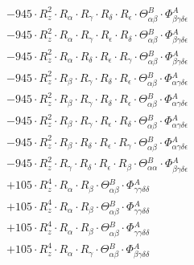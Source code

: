 \documentclass{article}
\begin{document}
\begin{subequations}
\begin{gather}
\begin{array}{c}
 \\[0.2em] 		 - 945 \cdot R_{z}^{2} \cdot R_{\alpha{}} \cdot R_{\gamma{}} \cdot R_{\delta{}} \cdot R_{\epsilon{}} \cdot \Theta{}^{B}_{\alpha{}\beta{}} \cdot \Phi{}^{A}_{\beta{}\gamma{}\delta{}\epsilon{}} 
 \\[0.2em] 		 - 945 \cdot R_{z}^{2} \cdot R_{\alpha{}} \cdot R_{\gamma{}} \cdot R_{\epsilon{}} \cdot R_{\delta{}} \cdot \Theta{}^{B}_{\alpha{}\beta{}} \cdot \Phi{}^{A}_{\beta{}\gamma{}\delta{}\epsilon{}} 
 \\[0.2em] 		 - 945 \cdot R_{z}^{2} \cdot R_{\alpha{}} \cdot R_{\delta{}} \cdot R_{\epsilon{}} \cdot R_{\gamma{}} \cdot \Theta{}^{B}_{\alpha{}\beta{}} \cdot \Phi{}^{A}_{\beta{}\gamma{}\delta{}\epsilon{}} 
 \\[0.2em] 		 - 945 \cdot R_{z}^{2} \cdot R_{\beta{}} \cdot R_{\gamma{}} \cdot R_{\delta{}} \cdot R_{\epsilon{}} \cdot \Theta{}^{B}_{\alpha{}\beta{}} \cdot \Phi{}^{A}_{\alpha{}\gamma{}\delta{}\epsilon{}} 
 \\[0.2em] 		 - 945 \cdot R_{z}^{2} \cdot R_{\beta{}} \cdot R_{\gamma{}} \cdot R_{\delta{}} \cdot R_{\epsilon{}} \cdot \Theta{}^{B}_{\alpha{}\beta{}} \cdot \Phi{}^{A}_{\alpha{}\gamma{}\delta{}\epsilon{}} 
 \\[0.2em] 		 - 945 \cdot R_{z}^{2} \cdot R_{\beta{}} \cdot R_{\gamma{}} \cdot R_{\epsilon{}} \cdot R_{\delta{}} \cdot \Theta{}^{B}_{\alpha{}\beta{}} \cdot \Phi{}^{A}_{\alpha{}\gamma{}\delta{}\epsilon{}} 
 \\[0.2em] 		 - 945 \cdot R_{z}^{2} \cdot R_{\beta{}} \cdot R_{\delta{}} \cdot R_{\epsilon{}} \cdot R_{\gamma{}} \cdot \Theta{}^{B}_{\alpha{}\beta{}} \cdot \Phi{}^{A}_{\alpha{}\gamma{}\delta{}\epsilon{}} 
 \\[0.2em] 		 - 945 \cdot R_{z}^{2} \cdot R_{\gamma{}} \cdot R_{\delta{}} \cdot R_{\epsilon{}} \cdot R_{\beta{}} \cdot \Theta{}^{B}_{\alpha{}\alpha{}} \cdot \Phi{}^{A}_{\beta{}\gamma{}\delta{}\epsilon{}} 
 \\[0.2em] 		 + 105 \cdot R_{z}^{4} \cdot R_{\alpha{}} \cdot R_{\beta{}} \cdot \Theta{}^{B}_{\alpha{}\beta{}} \cdot \Phi{}^{A}_{\gamma{}\gamma{}\delta{}\delta{}} 
 \\[0.2em] 		 + 105 \cdot R_{z}^{4} \cdot R_{\alpha{}} \cdot R_{\beta{}} \cdot \Theta{}^{B}_{\alpha{}\beta{}} \cdot \Phi{}^{A}_{\gamma{}\gamma{}\delta{}\delta{}} 
 \\[0.2em] 		 + 105 \cdot R_{z}^{4} \cdot R_{\alpha{}} \cdot R_{\beta{}} \cdot \Theta{}^{B}_{\alpha{}\beta{}} \cdot \Phi{}^{A}_{\gamma{}\gamma{}\delta{}\delta{}} 
 \\[0.2em] 		 + 105 \cdot R_{z}^{4} \cdot R_{\alpha{}} \cdot R_{\gamma{}} \cdot \Theta{}^{B}_{\alpha{}\beta{}} \cdot \Phi{}^{A}_{\beta{}\gamma{}\delta{}\delta{}} 

\end{array}
\end{gather}
\end{subequations}
\end{document}
